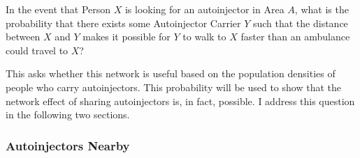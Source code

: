 \begin{adjustwidth}{2.5em}{0pt}
    In the event that Person $X$ is looking for an autoinjector in Area $A$, what is the probability that there exists some Autoinjector Carrier $Y$ such that the distance between $X$ and $Y$ makes it possible for $Y$ to walk to $X$ faster than an ambulance could travel to $X$?
\end{adjustwidth}

This asks whether this network is useful based on the population densities of people who carry autoinjectors. This probability will be used to show that the network effect of sharing autoinjectors is, in fact, possible. I address this question in the following two sections.

\subsubsection{Autoinjectors Nearby} \label{autoinjectors-nearby}

